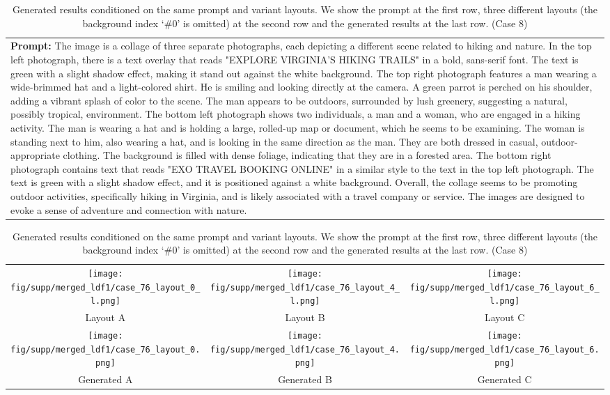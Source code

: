 \begin{table}[htbp]
    \centering
    \begin{tabular}{p{\textwidth}}
    \midrule
    \textbf{Prompt:} \small{The image is a collage of three separate photographs, each depicting a different scene related to hiking and nature. In the top left photograph, there is a text overlay that reads "EXPLORE VIRGINIA'S HIKING TRAILS" in a bold, sans-serif font. The text is green with a slight shadow effect, making it stand out against the white background. The top right photograph features a man wearing a wide-brimmed hat and a light-colored shirt. He is smiling and looking directly at the camera. A green parrot is perched on his shoulder, adding a vibrant splash of color to the scene. The man appears to be outdoors, surrounded by lush greenery, suggesting a natural, possibly tropical, environment. The bottom left photograph shows two individuals, a man and a woman, who are engaged in a hiking activity. The man is wearing a hat and is holding a large, rolled-up map or document, which he seems to be examining. The woman is standing next to him, also wearing a hat, and is looking in the same direction as the man. They are both dressed in casual, outdoor-appropriate clothing. The background is filled with dense foliage, indicating that they are in a forested area. The bottom right photograph contains text that reads "EXO TRAVEL BOOKING ONLINE" in a similar style to the text in the top left photograph. The text is green with a slight shadow effect, and it is positioned against a white background. Overall, the collage seems to be promoting outdoor activities, specifically hiking in Virginia, and is likely associated with a travel company or service. The images are designed to evoke a sense of adventure and connection with nature.}
    \vspace{1em}
    \end{tabular}
    \begin{tabular}{ccc}
        \texttt{[image: fig/supp/merged\_ldf1/case\_76\_layout\_0\_l.png]} &
        \texttt{[image: fig/supp/merged\_ldf1/case\_76\_layout\_4\_l.png]} &
        \texttt{[image: fig/supp/merged\_ldf1/case\_76\_layout\_6\_l.png]} \\
        \small{Layout A} & \small{Layout B} & \small{Layout C} \\[1em]
        \texttt{[image: fig/supp/merged\_ldf1/case\_76\_layout\_0.png]} &
        \texttt{[image: fig/supp/merged\_ldf1/case\_76\_layout\_4.png]} &
        \texttt{[image: fig/supp/merged\_ldf1/case\_76\_layout\_6.png]} \\
        \small{Generated A} & \small{Generated B} & \small{Generated C} \\
        \bottomrule
    \end{tabular}
    
    \caption{Generated results conditioned on the same prompt and variant layouts. We show the prompt at the first row, three different layouts (the background index `\#0' is omitted) at the second row and the generated results at the last row. (Case 8)}
    \label{tab:variant_layout8}
\end{table}

